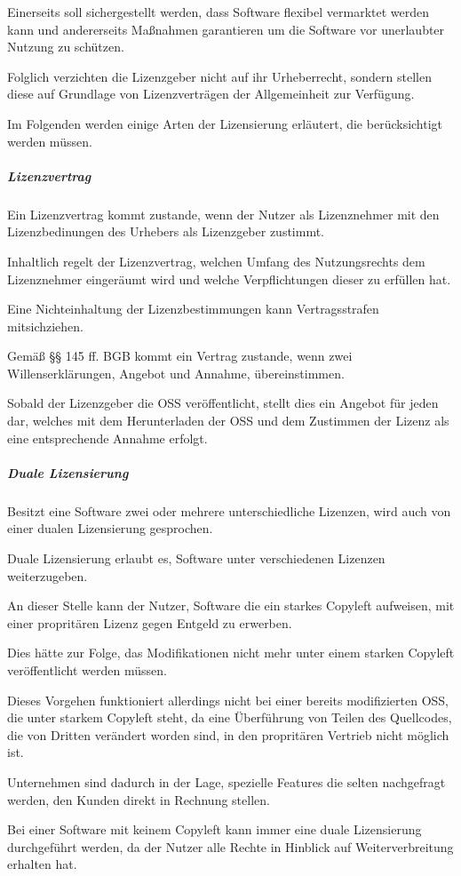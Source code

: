 Einerseits soll sichergestellt werden, dass Software flexibel vermarktet werden kann und andererseits Maßnahmen garantieren um die Software vor unerlaubter Nutzung zu schützen. 

Folglich verzichten die Lizenzgeber nicht auf ihr Urheberrecht, sondern stellen diese auf Grundlage von Lizenzverträgen der Allgemeinheit zur Verfügung. 

Im Folgenden werden einige Arten der Lizensierung erläutert, die berücksichtigt werden müssen.  

\subparagraph{Lizenzvertrag}
Ein Lizenzvertrag kommt zustande, wenn der Nutzer als Lizenznehmer mit den Lizenzbedinungen des Urhebers als Lizenzgeber zustimmt. 

Inhaltlich regelt der Lizenzvertrag, welchen Umfang des Nutzungsrechts dem Lizenznehmer eingeräumt wird und welche Verpflichtungen dieser zu erfüllen hat.

Eine Nichteinhaltung der Lizenzbestimmungen kann Vertragsstrafen mitsichziehen. 

Gemäß §§ 145 ff. BGB kommt ein Vertrag zustande, wenn zwei Willenserklärungen, Angebot und Annahme, übereinstimmen. 

Sobald der Lizenzgeber die OSS veröffentlicht, stellt dies ein Angebot für jeden dar, welches mit dem Herunterladen der OSS und dem Zustimmen der Lizenz als eine entsprechende Annahme erfolgt. 

\subparagraph{Duale Lizensierung}
Besitzt eine Software zwei oder mehrere unterschiedliche Lizenzen, wird auch von einer dualen Lizensierung gesprochen.

Duale Lizensierung erlaubt es, Software unter verschiedenen Lizenzen weiterzugeben. 

An dieser Stelle kann der Nutzer, Software die ein starkes Copyleft aufweisen, mit einer propritären Lizenz gegen Entgeld zu erwerben. 

Dies hätte zur Folge, das Modifikationen nicht mehr unter einem starken Copyleft veröffentlicht werden müssen. 

Dieses Vorgehen funktioniert allerdings nicht bei einer bereits modifizierten OSS, die unter starkem Copyleft steht, da eine Überführung von Teilen des Quellcodes, die von Dritten verändert worden sind, in den propritären Vertrieb nicht möglich ist. 

Unternehmen sind dadurch in der Lage, spezielle Features die selten nachgefragt werden, den Kunden direkt in Rechnung stellen. 

Bei einer Software mit keinem Copyleft kann immer eine duale Lizensierung durchgeführt werden, da der Nutzer alle Rechte in Hinblick auf Weiterverbreitung erhalten hat. 






